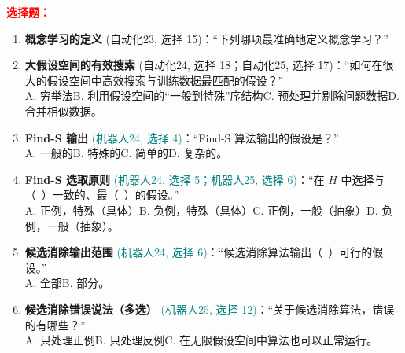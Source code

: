 ﻿\documentclass[../main.tex]{subfiles}
\begin{document}
\noindent\textbf{\textcolor{red}{选择题：}}
\begin{enumerate}[itemsep=0.45em, topsep=0.2em, leftmargin=1.5em]
    \item \textbf{概念学习的定义} \textcolor{autoclassgreen}{(自动化23, 选择 15)}：``下列哪项最准确地定义概念学习？''\\
     

    \item \textbf{大假设空间的有效搜索} \textcolor{autoclassgreen}{(自动化24, 选择 18；自动化25, 选择 17)}：``如何在很大的假设空间中高效搜索与训练数据最匹配的假设？''\\
    A. 穷举法\quad B. 利用假设空间的``一般到特殊''序结构\quad C. 预处理并剔除问题数据\quad D. 合并相似数据。 

    \item \textbf{Find-S 输出} \textcolor{teal}{(机器人24, 选择 4)}：``Find-S 算法输出的假设是？''\\
    A. 一般的\quad B. 特殊的\quad C. 简单的\quad D. 复杂的。 

    \item \textbf{Find-S 选取原则} \textcolor{teal}{(机器人24, 选择 5；机器人25, 选择 6)}：``在 $H$ 中选择与（\ ）一致的、最（\ ）的假设。''\\
    A. 正例，特殊（具体）\quad B. 负例，特殊（具体）\quad C. 正例，一般（抽象）\quad D. 负例，一般（抽象）。 

    \item \textbf{候选消除输出范围} \textcolor{teal}{(机器人24, 选择 6)}：``候选消除算法输出（\ ）可行的假设。''\\
    A. 全部\quad B. 部分\quad {}\quad {}。 

    \item \textbf{候选消除错误说法（多选）} \textcolor{teal}{(机器人25, 选择 12)}：``关于候选消除算法，错误的有哪些？''\\
    A. 只处理正例\quad B. 只处理反例\quad C. 在无限假设空间中算法也可以正常运行\quad {}。 


\end{enumerate}
\end{document}
